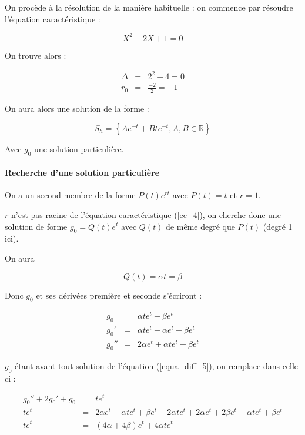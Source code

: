 \documentclass[a4paper, 11pt]{report} %
\newcommand{\R}{\mathbb{R}}
\begin{document}
On procède à la résolution de la manière habituelle : on commence par résoudre l'équation caractéristique :

\begin{equation}
X^2 + 2X + 1 = 0
\label{ec_4}
\end{equation}

On trouve alors :

\begin{eqnarray*}
\Delta & = & 2^2-4 = 0\\
r_0 & = & \frac{-2}{2} = -1
\end{eqnarray*}

On aura alors une solution de la forme :

\[
S_h = \left\{Ae^{-t}+Bte^{-t}, A,B\in\R\right\}
\]

Avec $g_0$ une solution particulière.

\paragraph{Recherche d'une solution particulière}

On a un second membre de la forme $P(t)e^{rt}$ avec $P(t) = t$ et $r = 1$.

$r$ n'est pas racine de l'équation caractéristique (\ref{ec_4}), on cherche donc une solution de forme $g_0 = Q(t)e^t$
avec $Q(t)$ de même degré que $P(t)$ (degré 1 ici).

On aura

\[ Q(t) = \alpha t = \beta \]

Donc $g_0$ et ses dérivées première et seconde s'écriront :

\begin{eqnarray*}
    g_0 & = & \alpha t e^t + \beta e^t\\
    g_0' & = & \alpha t e^t + \alpha e^t + \beta e^t\\
    g_0'' & = & 2\alpha e^t + \alpha t e^t + \beta e^t
\end{eqnarray*}

$g_0$ étant avant tout solution de l'équation (\ref{equa_diff_5}), on remplace dans celle-ci :

\begin{eqnarray*}
g_0'' + 2g_0' + g_0 & = & te^t\\
te^t & = & 2\alpha e^t + \alpha t e^t + \beta e^t + 2\alpha t e^t + 2\alpha e^t + 2\beta e^t +\alpha t e^t + \beta e^t\\
te^t & = &(4\alpha + 4\beta) e^t + 4\alpha t e^t
\end{eqnarray*}
\end{document}

